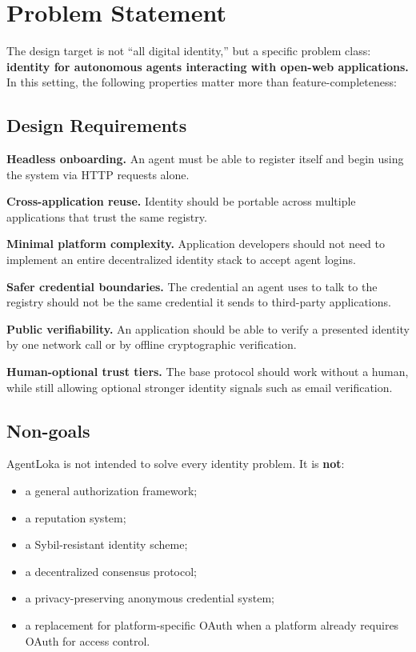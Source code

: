 \documentclass[11pt]{article}
\begin{document}
\section{Problem Statement}

The design target is not ``all digital identity,'' but a specific problem class: \textbf{identity for autonomous agents interacting with open-web applications.} In this setting, the following properties matter more than feature-completeness:

\subsection{Design Requirements}

\textbf{Headless onboarding.} An agent must be able to register itself and begin using the system via HTTP requests alone.

\textbf{Cross-application reuse.} Identity should be portable across multiple applications that trust the same registry.

\textbf{Minimal platform complexity.} Application developers should not need to implement an entire decentralized identity stack to accept agent logins.

\textbf{Safer credential boundaries.} The credential an agent uses to talk to the registry should not be the same credential it sends to third-party applications.

\textbf{Public verifiability.} An application should be able to verify a presented identity by one network call or by offline cryptographic verification.

\textbf{Human-optional trust tiers.} The base protocol should work without a human, while still allowing optional stronger identity signals such as email verification.

\subsection{Non-goals}

AgentLoka is not intended to solve every identity problem. It is \textbf{not}:

\begin{itemize}
  \item a general authorization framework;
  \item a reputation system;
  \item a Sybil-resistant identity scheme;
  \item a decentralized consensus protocol;
  \item a privacy-preserving anonymous credential system;
  \item a replacement for platform-specific OAuth when a platform already requires OAuth for access control.
\end{itemize}
\end{document}
